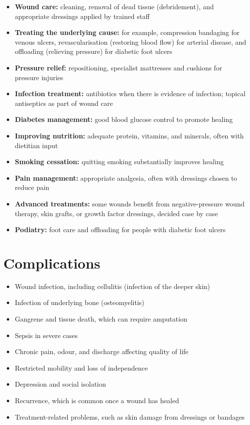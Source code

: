 \begin{itemize}
    \item \textbf{Wound care:} cleaning, removal of dead tissue (debridement), and appropriate dressings applied by trained staff
    \item \textbf{Treating the underlying cause:} for example, compression bandaging for venous ulcers, revascularisation (restoring blood flow) for arterial disease, and offloading (relieving pressure) for diabetic foot ulcers
    \item \textbf{Pressure relief:} repositioning, specialist mattresses and cushions for pressure injuries
    \item \textbf{Infection treatment:} antibiotics when there is evidence of infection; topical antiseptics as part of wound care
    \item \textbf{Diabetes management:} good blood glucose control to promote healing
    \item \textbf{Improving nutrition:} adequate protein, vitamins, and minerals, often with dietitian input
    \item \textbf{Smoking cessation:} quitting smoking substantially improves healing
    \item \textbf{Pain management:} appropriate analgesia, often with dressings chosen to reduce pain
    \item \textbf{Advanced treatments:} some wounds benefit from negative-pressure wound therapy, skin grafts, or growth factor dressings, decided case by case
    \item \textbf{Podiatry:} foot care and offloading for people with diabetic foot ulcers
\end{itemize}

\section*{Complications}
\begin{itemize}
    \item Wound infection, including cellulitis (infection of the deeper skin)
    \item Infection of underlying bone (osteomyelitis)
    \item Gangrene and tissue death, which can require amputation
    \item Sepsis in severe cases
    \item Chronic pain, odour, and discharge affecting quality of life
    \item Restricted mobility and loss of independence
    \item Depression and social isolation
    \item Recurrence, which is common once a wound has healed
    \item Treatment-related problems, such as skin damage from dressings or bandages
\end{itemize}

